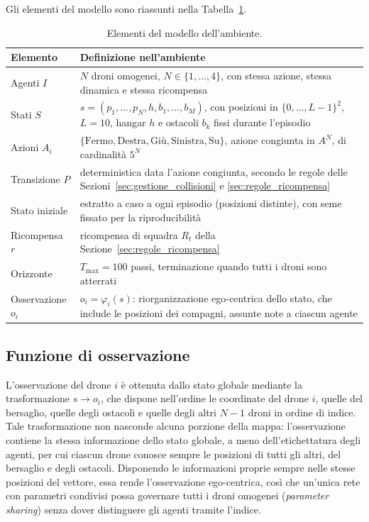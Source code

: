 \documentclass[12pt,a4paper,twoside]{report}
\newcommand{\fonte}[1][elaborazione propria]{\par\vspace{3pt}{\footnotesize\emph{Fonte: #1.}}}
\begin{document}
Gli elementi del modello sono riassunti nella Tabella~\ref{tab:3_4}.

\begin{table}[htbp]
    \centering
    \begin{tabularx}{\textwidth}{l X}
        \toprule
        \textbf{Elemento} & \textbf{Definizione nell'ambiente} \\
        \midrule
        Agenti $I$         & $N$ droni omogenei, $N \in \{1, \dots, 4\}$, con stessa azione, stessa dinamica e stessa ricompensa \\
        Stati $S$          & $s = (p_1, \dots, p_N, h, b_1, \dots, b_M)$, con posizioni in $\{0, \dots, L - 1\}^2$, $L = 10$, hangar $h$ e ostacoli $b_k$ fissi durante l'episodio \\
        Azioni $A_i$       & $\{\text{Fermo}, \text{Destra}, \text{Giù}, \text{Sinistra}, \text{Su}\}$, azione congiunta in $A^N$, di cardinalità $5^N$ \\
        Transizione $P$    & deterministica data l'azione congiunta, secondo le regole delle Sezioni~\ref{sec:gestione_collisioni} e \ref{sec:regole_ricompensa} \\
        Stato iniziale     & estratto a caso a ogni episodio (posizioni distinte), con seme fissato per la riproducibilità \\
        Ricompensa $r$     & ricompensa di squadra $R_t$ della Sezione~\ref{sec:regole_ricompensa} \\
        Orizzonte          & $T_{\max} = 100$ passi, terminazione quando tutti i droni sono atterrati \\
        Osservazione $o_i$ & $o_i = \varphi_i(s)$: riorganizzazione ego-centrica dello stato, che include le posizioni dei compagni, assunte note a ciascun agente \\
        \bottomrule
    \end{tabularx}
    \caption{Elementi del modello dell'ambiente.}
    \label{tab:3_4}
    \fonte
\end{table}

\subsection{Funzione di osservazione}
\label{subsec:funzione_osservazione}
L'osservazione del drone $i$ è ottenuta dallo stato globale mediante la trasformazione $s \to o_i$, che dispone nell'ordine le coordinate del drone $i$, quelle del bersaglio, quelle degli ostacoli e quelle degli altri $N - 1$ droni in ordine di indice. Tale trasformazione non nasconde alcuna porzione della mappa: l'osservazione contiene la stessa informazione dello stato globale, a meno dell'etichettatura degli agenti, per cui ciascun drone conosce sempre le posizioni di tutti gli altri, del bersaglio e degli ostacoli. Disponendo le informazioni proprie sempre nelle stesse posizioni del vettore, essa rende l'osservazione ego-centrica, così che un'unica rete con parametri condivisi possa governare tutti i droni omogenei (\emph{parameter sharing}) senza dover distinguere gli agenti tramite l'indice.
\end{document}
